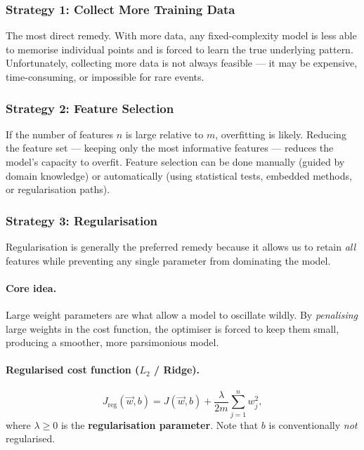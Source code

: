 \subsubsection{Strategy 1: Collect More Training Data}

The most direct remedy. With more data, any fixed-complexity model is less able
to memorise individual points and is forced to learn the true underlying pattern.
Unfortunately, collecting more data is not always feasible — it may be
expensive, time-consuming, or impossible for rare events.

\subsubsection{Strategy 2: Feature Selection}

If the number of features $n$ is large relative to $m$, overfitting is likely.
Reducing the feature set — keeping only the most informative features — reduces
the model's capacity to overfit. Feature selection can be done manually
(guided by domain knowledge) or automatically (using statistical tests, embedded
methods, or regularisation paths).

\subsubsection{Strategy 3: Regularisation}
\label{sec:regularisation}

Regularisation is generally the preferred remedy because it allows us to retain
\emph{all} features while preventing any single parameter from dominating the
model.

\paragraph{Core idea.}
Large weight parameters are what allow a model to oscillate wildly. By
\emph{penalising} large weights in the cost function, the optimiser is forced
to keep them small, producing a smoother, more parsimonious model.

\paragraph{Regularised cost function ($L_2$ / Ridge).}
\begin{equation}
J_{\text{reg}}(\vec{w},b)
=J(\vec{w},b)+\frac{\lambda}{2m}\sum_{j=1}^n w_j^2,
\label{eq:reg-cost}
\end{equation}
where $\lambda\ge 0$ is the \textbf{regularisation parameter}. Note that $b$
is conventionally \emph{not} regularised.

